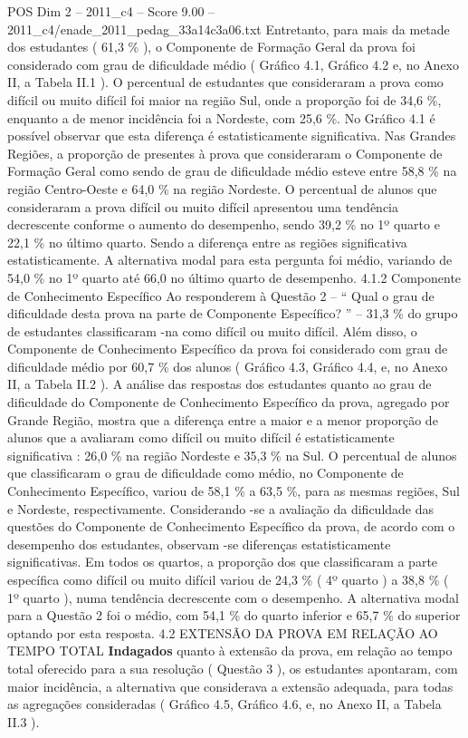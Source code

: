 \begin{textsample}{POS Dim 2 – 2011\_c4 – Score 9.00 – 2011\_c4/enade\_2011\_pedag\_33a14c3a06.txt}
Entretanto, para mais da metade dos estudantes ( 61,3 \% ), o Componente de Formação Geral da prova foi considerado com grau de dificuldade médio ( Gráfico 4.1, Gráfico 4.2 e, no Anexo II, a Tabela II.1 ).
O percentual de estudantes que consideraram a prova como difícil ou muito difícil foi maior na região Sul, onde a proporção foi de 34,6 \%, enquanto a de menor incidência foi a Nordeste, com 25,6 \%.
No Gráfico 4.1 é possível observar que esta diferença é estatisticamente significativa.
Nas Grandes Regiões, a proporção de presentes à prova que consideraram o Componente de Formação Geral como sendo de grau de dificuldade médio esteve entre 58,8 \% na região Centro-Oeste e 64,0 \% na região Nordeste.
O percentual de alunos que consideraram a prova difícil ou muito difícil apresentou uma tendência decrescente conforme o aumento do desempenho, sendo 39,2 \% no 1º quarto e 22,1 \% no último quarto.
Sendo a diferença entre as regiões significativa estatisticamente.
A alternativa modal para esta pergunta foi médio, variando de 54,0 \% no 1º quarto até 66,0 no último quarto de desempenho. 4.1.2 Componente de Conhecimento Específico Ao responderem à Questão 2 – “ Qual o grau de dificuldade desta prova na parte de Componente Específico? ” – 31,3 \% do grupo de estudantes classificaram -na como difícil ou muito difícil.
Além disso, o Componente de Conhecimento Específico da prova foi considerado com grau de dificuldade médio por 60,7 \% dos alunos ( Gráfico 4.3, Gráfico 4.4, e, no Anexo II, a Tabela II.2 ).
A análise das respostas dos estudantes quanto ao grau de dificuldade do Componente de Conhecimento Específico da prova, agregado por Grande Região, mostra que a diferença entre a maior e a menor proporção de alunos que a avaliaram como difícil ou muito difícil é estatisticamente significativa : 26,0 \% na região Nordeste e 35,3 \% na Sul.
O percentual de alunos que classificaram o grau de dificuldade como médio, no Componente de Conhecimento Específico, variou de 58,1 \% a 63,5 \%, para as mesmas regiões, Sul e Nordeste, respectivamente.
Considerando -se a avaliação da dificuldade das questões do Componente de Conhecimento Específico da prova, de acordo com o desempenho dos estudantes, observam -se diferenças estatisticamente significativas.
Em todos os quartos, a proporção dos que classificaram a parte específica como difícil ou muito difícil variou de 24,3 \% ( 4º quarto ) a 38,8 \% ( 1º quarto ), numa tendência decrescente com o desempenho.
A alternativa modal para a Questão 2 foi o médio, com 54,1 \% do quarto inferior e 65,7 \% do superior optando por esta resposta. 4.2 EXTENSÃO DA PROVA EM RELAÇÃO AO TEMPO TOTAL \textbf{Indagados} quanto à extensão da prova, em relação ao tempo total oferecido para a sua resolução ( Questão 3 ), os estudantes apontaram, com maior incidência, a alternativa que considerava a extensão adequada, para todas as agregações consideradas ( Gráfico 4.5, Gráfico 4.6, e, no Anexo II, a Tabela II.3 ).

\end{textsample}

